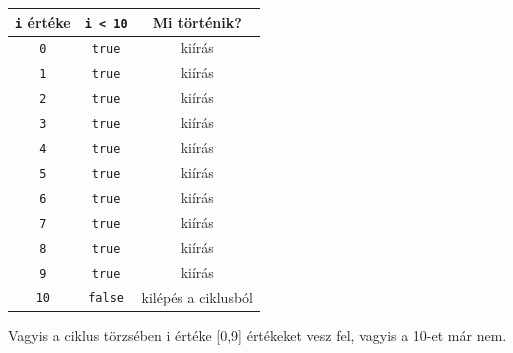 \documentclass[a4paper]{article}
\begin{document}
\begin{center}
	\begin{tabular}{||c | c | c||} 
		\hline
		\lstinline[]$i$ értéke & \lstinline[]$i < 10$ & Mi történik? \\ %
		\hline\hline
		\lstinline[]$0$ & \lstinline[]$true$ & kiírás \\
		\hline
		\lstinline[]$1$ & \lstinline[]$true$ & kiírás \\
		\hline
		\lstinline[]$2$ & \lstinline[]$true$ & kiírás \\
		\hline
		\lstinline[]$3$ & \lstinline[]$true$ & kiírás \\
		\hline
		\lstinline[]$4$ & \lstinline[]$true$ & kiírás \\
		\hline
		\lstinline[]$5$ & \lstinline[]$true$ & kiírás \\
		\hline
		\lstinline[]$6$ & \lstinline[]$true$ & kiírás \\
		\hline
		\lstinline[]$7$ & \lstinline[]$true$ & kiírás \\
		\hline
		\lstinline[]$8$ & \lstinline[]$true$ & kiírás \\
		\hline
		\lstinline[]$9$ & \lstinline[]$true$ & kiírás \\
		\hline
		\lstinline[]$10$ & \lstinline[]$false$ & kilépés a ciklusból \\
		\hline
	\end{tabular}
\end{center}

Vagyis a ciklus törzsében i értéke [0,9] értékeket vesz fel, vagyis a 10-et már nem.
	
\end{document}
